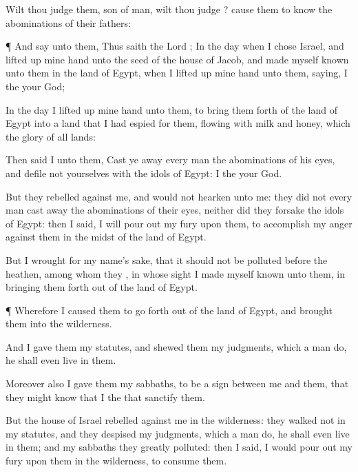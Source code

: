 {Wilt thou
judge them,
son of
man, wilt thou
judge
{}? cause them to
know the
abominations of their
fathers:


\par }{\PP {}¶ And
say unto them, Thus
saith the
Lord
{}; In the
day when I
chose
Israel, and lifted
up mine
hand unto the
seed of the
house of
Jacob, and made myself
known unto them in the
land of
Egypt, when I
lifted up mine
hand unto them,
saying, I
{} the
{} your
God;

In the
day
{} I lifted
up mine
hand unto them, to bring them
forth of the
land of
Egypt into a
land that I had
espied for them,
flowing with
milk and
honey, which
{} the
glory of all
lands:

Then
said I unto them, Cast ye
away every
man the
abominations of his
eyes, and
defile not yourselves with the
idols of
Egypt: I
{} the
{} your
God.

But they
rebelled against me, and
would not
hearken unto me: they did not every
man cast
away the
abominations of their
eyes, neither did they
forsake the
idols of
Egypt: then I
said, I will pour
out my
fury upon them, to
accomplish my
anger against them in the
midst of the
land of
Egypt.

But I
wrought for my
name’s sake, that it should not be
polluted
before the
heathen,
among whom they
{}, in whose
sight I made myself
known unto them, in bringing them
forth out of the
land of
Egypt.


\par }{\PP {}¶ Wherefore I caused them to go
forth out of the
land of
Egypt, and
brought them into the
wilderness.

And I
gave them my
statutes, and
shewed them my
judgments, which
{} a
man
do, he shall even
live in them.

Moreover also I
gave them my
sabbaths, to be a
sign between me and them, that they might
know that I
{} the
{} that
sanctify them.

But the
house of
Israel
rebelled against me in the
wilderness: they
walked not in my
statutes, and they
despised my
judgments, which
{} a
man
do, he shall even
live in them; and my
sabbaths they
greatly
polluted: then I
said, I would pour
out my
fury upon them in the
wilderness, to
consume them.

}

